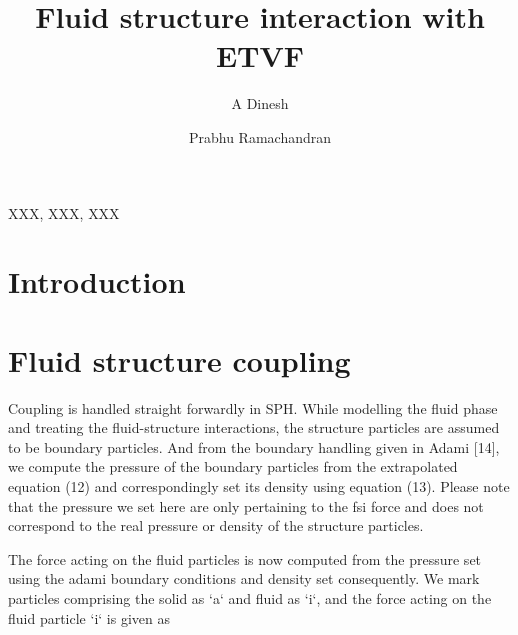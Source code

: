 \documentclass[preprint,12pt]{elsarticle}
\begin{document}
\begin{frontmatter}

  \title{Fluid structure interaction with ETVF}
  \author[IITB]{A Dinesh}
  \author[IITB]{Prabhu Ramachandran}
  \address[IITB]{Department of Aerospace Engineering, Indian Institute of
    Technology Bombay, Powai, Mumbai 400076}


\begin{abstract}
\end{abstract}

\begin{keyword}
{XXX}, {XXX}, {XXX}


\end{keyword}

\end{frontmatter}




\section{Introduction}
\label{sec:intro}





\section{Fluid structure coupling}
\label{sec:fsi-coupling}

Coupling is handled straight forwardly in SPH. While modelling the fluid phase
and treating the fluid-structure interactions, the structure particles are
assumed to be boundary particles. And from the boundary handling given in
Adami [14], we compute the pressure of the boundary particles from the
extrapolated equation (12) and correspondingly set its density using equation
(13). Please note that the pressure we set here are only pertaining to the fsi
force and does not correspond to the real pressure or density of the structure
particles.

The force acting on the fluid particles is now computed from the pressure set
using the adami boundary conditions and density set consequently. We mark
particles comprising the solid as `a` and fluid as `i`, and the force acting
on the fluid particle `i` is given as
\end{document}
